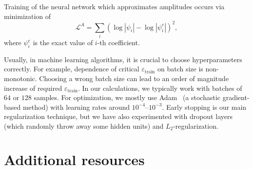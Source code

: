 Training of the neural network which approximates amplitudes occurs via minimization of
\begin{equation}
    \mathcal{L}^A = \sum_{i}\left(\log |\psi_i| - \log |\psi_i^{e}|\right)^2,
\end{equation}
where $\psi_i^{e}$ is the exact value of $i$-th coefficient.

Usually, in machine learning algorithms, it is crucial to choose hyperparameters correctly. For example, dependence of critical $\varepsilon_\text{train}$ on batch size is non-monotonic. Choosing a wrong batch size can lead to an order of magnitude increase of required $\varepsilon_\text{train}$. In our calculations, we typically work with batches of $64$ or $128$ samples. For optimization, we mostly use Adam~\cite{kingma2014adam} (a stochastic gradient-based method) with learning rates around $10^{-4}$--$10^{-3}$. Early stopping is our main regularization technique, but we have also experimented with dropout layers (which randomly throw away some hidden units) and $L_2$-regularization.
 

\section{Additional resources}

